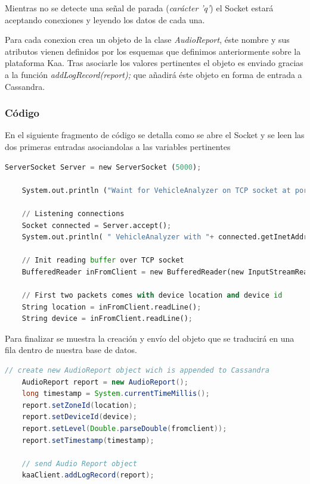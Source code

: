 Mientras no se detecte una señal de parada (\textit{carácter 'q'}) el Socket estará aceptando conexiones y leyendo los datos de cada una.

Para cada conexion crea un objeto de la clase \textit{AudioReport}, éste nombre y sus atributos vienen definidos por los esquemas que definimos anteriormente sobre la plataforma Kaa. Tras asociarle los valores pertinentes el objeto es enviado gracias a la función \textit{addLogRecord(report);} que añadirá éste objeto en forma de entrada a Cassandra.

\newpage

\subsubsection{Código}

En el siguiente fragmento de código se detalla como se abre el Socket y se leen las dos primeras entradas asociandolas a las variables pertinentes

\begin{lstlisting}[language=python,caption={Inicialización del Socket},label={lst:pi1}]
	ServerSocket Server = new ServerSocket (5000);

	System.out.println ("Waint for VehicleAnalyzer on TCP socket at port 5000");

	// Listening connections
	Socket connected = Server.accept();
	System.out.println( " VehicleAnalyzer with "+ connected.getInetAddress() +":"+connected.getPort()+" is connected! ");

	// Init reading buffer over TCP socket
	BufferedReader inFromClient = new BufferedReader(new InputStreamReader (connected.getInputStream()));

	// First two packets comes with device location and device id
	String location = inFromClient.readLine();
	String device = inFromClient.readLine();
\end{lstlisting}

Para finalizar se muestra la creación y envío del objeto que se traducirá en una fila dentro de nuestra base de datos.

\begin{lstlisting}[language=java,caption={Creación y envío de datos a Cassandra},label={lst:pi1}]
	// create new AudioReport object wich is appended to Cassandra
	AudioReport report = new AudioReport();
	long timestamp = System.currentTimeMillis();
	report.setZoneId(location);
	report.setDeviceId(device);
	report.setLevel(Double.parseDouble(fromclient));
	report.setTimestamp(timestamp);

	// send Audio Report object
	kaaClient.addLogRecord(report);
\end{lstlisting}

